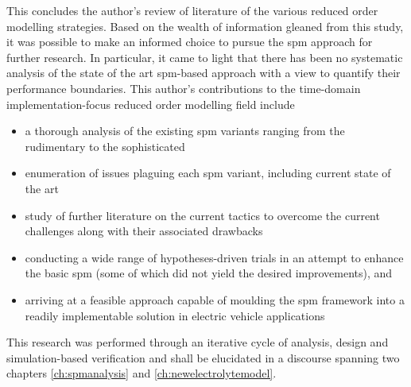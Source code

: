 This concludes  the author's review of  literature of the various  reduced order
modelling  strategies. Based  on the  wealth  of information  gleaned from  this
study,  it was  possible to  make  an informed  choice to  pursue the  \gls{spm}
approach  for further  research.  In particular,  it came  to  light that  there
has  been  no systematic  analysis  of  the  state  of the  art  \gls{spm}-based
approach with  a view  to quantify their  performance boundaries.  This author's
contributions to  the time-domain  implementation-focus reduced  order modelling
field include
\begin{itemize}[noitemsep,topsep=0pt, before={\vspace*{-0.25\baselineskip}}]
    \item a thorough analysis of the existing \gls{spm} variants ranging from the rudimentary to the sophisticated
    \item enumeration of issues plaguing each \gls{spm} variant, including current state of the art
    \item study of further literature on the current tactics to overcome the current challenges along with their associated drawbacks
    \item conducting a  wide range of hypotheses-driven trials in an attempt to enhance  the basic \gls{spm} (some of which did not yield the desired
        improvements), and
    \item arriving at  a  feasible  approach  capable  of  moulding  the
        \gls{spm}  framework into  a  readily implementable  solution in
        electric vehicle applications
\end{itemize}
This research was  performed through an iterative cycle of  analysis, design and
simulation-based verification  and shall be  elucidated in a  discourse spanning
two chapters \viz{} \cref{ch:spmanalysis} and \cref{ch:newelectrolytemodel}.


